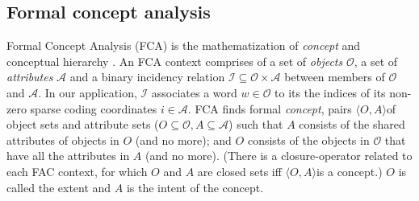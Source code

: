 \documentclass[11pt,a4paper]{article}
\begin{document}

\subsection{Formal concept analysis}

\newcommand{\ob}{\ensuremath{\mathcal O}}
\newcommand{\at}{\ensuremath{\mathcal A}}
\newcommand{\inci}{\ensuremath{\mathcal I}}
\newcommand{\oaconc}{\ensuremath{\langle O, A\rangle}}

Formal Concept Analysis (FCA) is the mathematization of \emph{concept} and conceptual
hierarchy \citep{Ganter:2012,Endres:2010}. %
An FCA context %
comprises of
a set of \emph{objects} $\ob$, a set of \emph{attributes} $\at$ and
a binary incidency relation $\inci \subseteq \ob \times \at$
between members of \ob and \at.
In our application, $\inci$ associates a word $w\in\ob$ to its 
the indices of its non-zero sparse coding coordinates $i\in\at$.
FCA finds formal \emph{concept}, pairs \oaconc of object sets and attribute sets
($O\subseteq \ob,A \subseteq \at$) such that $A$
consists of the shared attributes of objects in $O$ (and no more); and
$O$ consists of
the objects in $\ob$ that have all the attributes in $A$ (and no more).
(There is a closure-operator related to each FAC context, for which $O$ and $A$
are closed sets iff \oaconc is a concept.)
$O$ is called the extent and $A$ is the intent of the concept.
\end{document}
